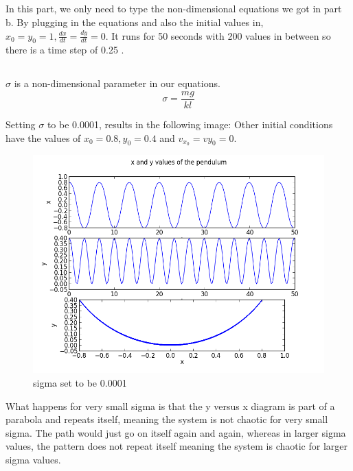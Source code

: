 \documentclass[letterpaper,12pt]{article}
\begin{document}
\subsection{}
In this part, we only need to type the non-dimensional equations we got in part b. By plugging in the equations and also the initial values in, \begin{math} x_{0}=y_{0}=1 , \frac{dx}{dt}=\frac{dy}{dt}=0\end{math}. It runs for 50 seconds with 200 values in between so there is a time step of 0.25 . 

\subsection{}
\begin{math}\sigma\end{math} is a non-dimensional parameter in our equations. 
\begin{equation}
\sigma = \frac{mg}{kl}
\end{equation}

Setting \begin{math}\sigma\end{math}  to be 0.0001, results in the following image:
Other initial conditions have the values of \begin{math}x_{0}=0.8, y_{0}=0.4  \end{math} and \begin{math} v_{x_{0}}=v{y_{0}}=0.\end{math}

\FloatBarrier
\begin{figure}[h!]
\centering
\includegraphics[scale=0.7]{3_d.png}
\caption{sigma set to be 0.0001}
\end{figure}


What happens for very small sigma is that the y versus x diagram is part of a parabola and repeats itself, meaning the system is not chaotic for very small sigma. The path would just go on itself again and again, whereas in larger sigma values, the pattern does not repeat itself meaning the system is chaotic for larger sigma values.

\FloatBarrier
\end{document}
